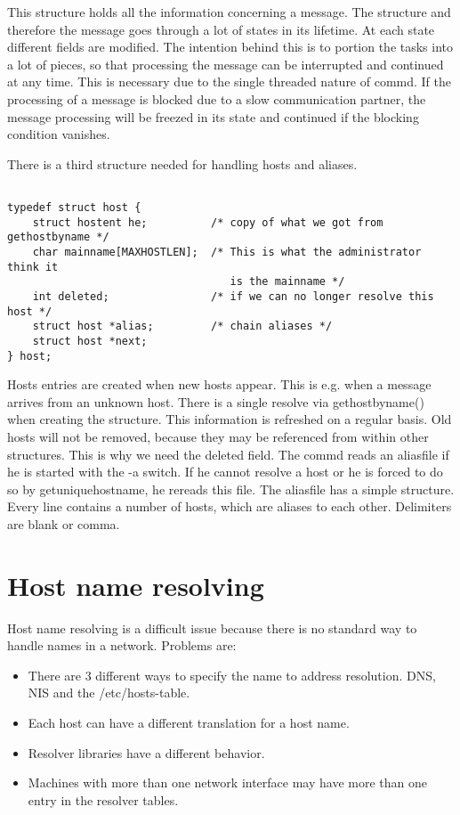 This structure holds all the information concerning a message. The structure
and therefore the message goes through a lot of states in its lifetime.
At each state different fields are modified. The intention behind this is
to portion the tasks into a lot of pieces, so that processing the message
can be interrupted and continued at any time. This is necessary due to the
single threaded nature of commd. If the processing of a message is blocked
due to a slow communication partner, the message processing will be freezed
in its state and continued if the blocking condition vanishes.
\bigskip


There is a third structure needed for handling hosts and aliases.

\begin{verbatim}

typedef struct host {
    struct hostent he;          /* copy of what we got from gethostbyname */
    char mainname[MAXHOSTLEN];  /* This is what the administrator think it 
                                   is the mainname */
    int deleted;                /* if we can no longer resolve this host */
    struct host *alias;         /* chain aliases */
    struct host *next;
} host;

\end{verbatim}

Hosts entries are created when new hosts appear. This is e.g. when a message 
arrives from an unknown host. There is a single resolve via gethostbyname()
when creating the structure. This information is refreshed on a regular basis.
Old hosts will not be removed, because they may be referenced from within 
other structures. This is why we need the deleted field. The commd reads an
aliasfile if he is started with the -a switch. If he cannot resolve a host or
he is forced to do so by getuniquehostname, he rereads this file. The aliasfile
has a simple structure. Every line contains a number of hosts, which are 
aliases to each other. Delimiters are blank or comma.

\section{Host name resolving}

Host name resolving is a difficult issue because there is no standard way to
handle names in a network. Problems are:

\begin{itemize}
\item There are 3 different ways to specify the name to address resolution.
DNS, NIS and the /etc/hosts-table.
\item Each host can have a different translation for a host name.
\item Resolver libraries have a different behavior.
\item Machines with more than one network interface may have more than one
entry in the resolver tables.
\end{itemize}

